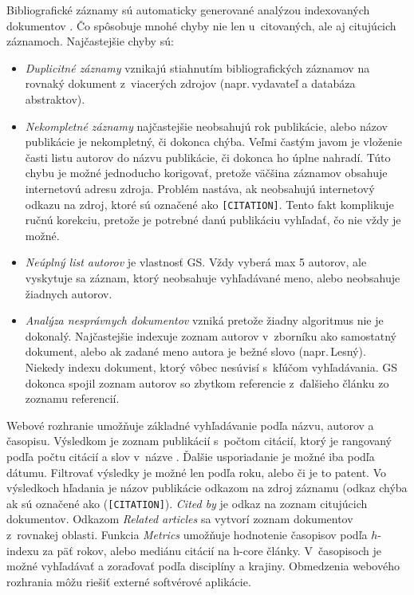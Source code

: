 Bibliografické záznamy sú automaticky generované analýzou indexovaných
dokumentov \citep{Vine2006}.  Čo spôsobuje mnohé chyby nie len u~citovaných, ale
aj citujúcich záznamoch.  Najčastejšie chyby sú:
\begin{itemize}
\item \emph{Duplicitné záznamy} vznikajú stiahnutím bibliografických záznamov na
  rovnaký dokument z~viacerých zdrojov (napr.\,vydavateľ a databáza abstraktov).
\item \emph{Nekompletné záznamy} najčastejšie neobsahujú rok publikácie, alebo
  názov publikácie je nekompletný, či dokonca chýba.  Veľmi častým javom je
  vloženie časti listu autorov do názvu publikácie, či dokonca ho úplne nahradí.
  Túto chybu je možné jednoducho korigovať, pretože väčšina záznamov obsahuje
  internetovú adresu zdroja.  Problém nastáva, ak neobsahujú internetový odkazu
  na zdroj, ktoré sú označené ako \texttt{[CITATION]}.  Tento fakt komplikuje
  ručnú korekciu, pretože je potrebné danú publikáciu vyhľadať, čo nie vždy je
  možné.
\item \emph{Neúplný list autorov} je vlastnosť GS.  Vždy vyberá max 5 autorov,
  ale vyskytuje sa záznam, ktorý neobsahuje vyhľadávané meno, alebo neobsahuje
  žiadnych autorov.
\item \emph{Analýza nesprávnych dokumentov} vzniká pretože žiadny algoritmus nie
  je dokonalý.  Najčastejšie indexuje zoznam autorov v~zborníku ako samostatný
  dokument, alebo ak zadané meno autora je bežné slovo (napr.\,Lesný).  Niekedy
  indexu dokument, ktorý vôbec nesúvisí s~kľúčom vyhľadávania.  GS dokonca
  spojil zoznam autorov so zbytkom referencie z~ďalšieho článku zo zoznamu
  referencií.
\end{itemize}

\noindent Webové rozhranie umožňuje základné vyhľadávanie podľa názvu, autorov a
časopisu.  Výsledkom je zoznam publikácií s~počtom citácií, ktorý je rangovaný
podľa počtu citácií a slov v~názve \citep{Beel2009}.  Ďalšie usporiadanie je
možné iba podľa dátumu.  Filtrovať výsledky je možné len podľa roku, alebo či je
to patent.  Vo výsledkoch hľadania je názov publikácie odkazom na zdroj záznamu
(odkaz chýba ak sú označené ako (\texttt{[CITATION]}).  \emph{Cited by} je odkaz
na zoznam citujúcich dokumentov.  Odkazom \emph{Related articles} sa vytvorí
zoznam dokumentov z~rovnakej oblasti.  Funkcia \emph{Metrics} umožňuje
hodnotenie časopisov podľa $h$-indexu za päť rokov, alebo mediánu citácií na
h-core články.  V~časopisoch je možné vyhľadávať a zoraďovať podľa disciplíny a
krajiny.  Obmedzenia webového rozhrania môžu riešiť externé softvérové
aplikácie.

